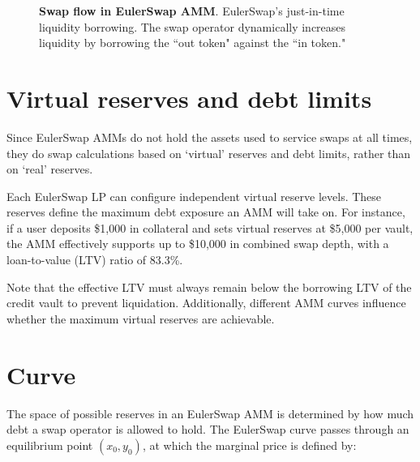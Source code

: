 \documentclass{article}
\begin{document}
\bigskip
\begin{figure}[h]
    \centering
    \caption{\textbf{Swap flow in EulerSwap AMM}. EulerSwap’s just-in-time liquidity borrowing. The swap operator dynamically increases liquidity by borrowing the ``out token" against the ``in token."}
    \label{fig:EulerSwap_liquidity}
\end{figure}

\section{Virtual reserves and debt limits}

Since EulerSwap AMMs do not hold the assets used to service swaps at all times, they do swap calculations based on `virtual' reserves and debt limits, rather than on `real' reserves. 

Each EulerSwap LP can configure independent virtual reserve levels. These reserves define the maximum debt exposure an AMM will take on. For instance, if a user deposits \$1,000 in collateral and sets virtual reserves at \$5,000 per vault, the AMM effectively supports up to \$10,000 in combined swap depth, with a loan-to-value (LTV) ratio of 83.3\%. 

Note that the effective LTV must always remain below the borrowing LTV of the credit vault to prevent liquidation. Additionally, different AMM curves influence whether the maximum virtual reserves are achievable.

\section{Curve}

The space of possible reserves in an EulerSwap AMM is determined by how much debt a swap operator is allowed to hold. The EulerSwap curve passes through an equilibrium point $(x_0, y_0)$, at which the marginal price is defined by:
\end{document}
